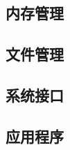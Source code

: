 \subsection{内存管理}
\label{sub:内存管理}

\subsection{文件管理}
\label{sub:文件管理}

\subsection{系统接口}
\label{sub:系统接口}

\subsection{应用程序}
\label{sub:应用程序}
